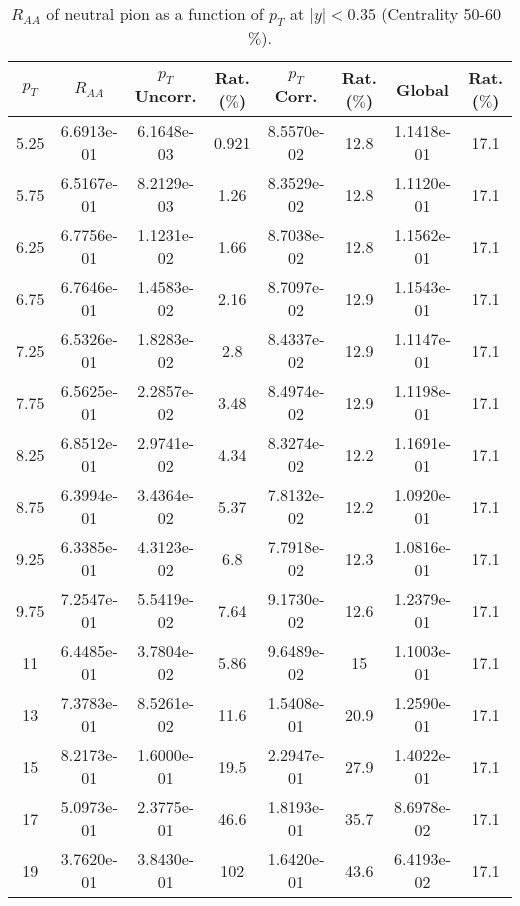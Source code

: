            
\begin{table}[!htb]
\centering
\begin{tabular}{|c|c|c|c|c|c|c|c|}
\hline
$p_{T}$ & $R_{AA}$ & $p_{T}$ Uncorr. & Rat. ($\%$) & $p_{T}$ Corr. & Rat. ($\%$) & Global & Rat. ($\%$)\\
\hline
5.25 & 6.6913e-01 & 6.1648e-03 & 0.921 & 8.5570e-02 & 12.8 & 1.1418e-01 & 17.1 \\ 
5.75 & 6.5167e-01 & 8.2129e-03 & 1.26 & 8.3529e-02 & 12.8 & 1.1120e-01 & 17.1 \\ 
6.25 & 6.7756e-01 & 1.1231e-02 & 1.66 & 8.7038e-02 & 12.8 & 1.1562e-01 & 17.1 \\ 
6.75 & 6.7646e-01 & 1.4583e-02 & 2.16 & 8.7097e-02 & 12.9 & 1.1543e-01 & 17.1 \\ 
7.25 & 6.5326e-01 & 1.8283e-02 & 2.8 & 8.4337e-02 & 12.9 & 1.1147e-01 & 17.1 \\ 
7.75 & 6.5625e-01 & 2.2857e-02 & 3.48 & 8.4974e-02 & 12.9 & 1.1198e-01 & 17.1 \\ 
8.25 & 6.8512e-01 & 2.9741e-02 & 4.34 & 8.3274e-02 & 12.2 & 1.1691e-01 & 17.1 \\ 
8.75 & 6.3994e-01 & 3.4364e-02 & 5.37 & 7.8132e-02 & 12.2 & 1.0920e-01 & 17.1 \\ 
9.25 & 6.3385e-01 & 4.3123e-02 & 6.8 & 7.7918e-02 & 12.3 & 1.0816e-01 & 17.1 \\ 
9.75 & 7.2547e-01 & 5.5419e-02 & 7.64 & 9.1730e-02 & 12.6 & 1.2379e-01 & 17.1 \\ 
11 & 6.4485e-01 & 3.7804e-02 & 5.86 & 9.6489e-02 & 15 & 1.1003e-01 & 17.1 \\ 
13 & 7.3783e-01 & 8.5261e-02 & 11.6 & 1.5408e-01 & 20.9 & 1.2590e-01 & 17.1 \\ 
15 & 8.2173e-01 & 1.6000e-01 & 19.5 & 2.2947e-01 & 27.9 & 1.4022e-01 & 17.1 \\ 
17 & 5.0973e-01 & 2.3775e-01 & 46.6 & 1.8193e-01 & 35.7 & 8.6978e-02 & 17.1 \\ 
19 & 3.7620e-01 & 3.8430e-01 & 102 & 1.6420e-01 & 43.6 & 6.4193e-02 & 17.1 \\ 
\hline
\end{tabular}
\caption{$R_{AA}$ of neutral pion as a function of $p_{T}$ at $|y|<0.35$ (Centrality 50-60~$\%$).}
\end{table}
            
